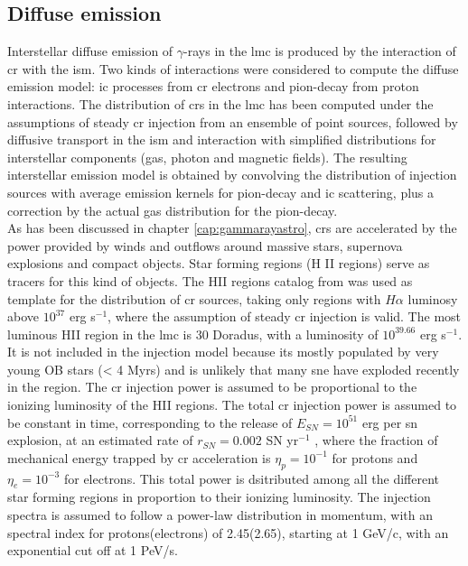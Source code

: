 \documentclass[main.tex]{subfiles}
\begin{document}
\subsection{Diffuse emission}
Interstellar diffuse emission of $\gamma$-rays in the \gls{lmc} is produced by the interaction of \gls{cr} with the \gls{ism}. Two kinds of interactions were considered to compute the diffuse emission model: \gls{ic} processes from \gls{cr} electrons and pion-decay from proton interactions. The distribution of \glspl{cr} in the \gls{lmc} has been computed under the assumptions of steady \gls{cr} injection from an ensemble of point sources, followed by diffusive transport in the \gls{ism} and interaction with simplified distributions for interstellar components (gas, photon and magnetic fields). The resulting interstellar emission model is obtained by convolving the distribution of injection sources with average emission kernels for pion-decay and \gls{ic} scattering, plus a correction by the actual gas distribution for the pion-decay.\\
As has been discussed in chapter \ref{cap:gammarayastro}, \glspl{cr} are accelerated by the power provided by winds and outflows around massive stars, supernova explosions and compact objects. Star forming regions (H II regions) serve as tracers for this kind of objects. The HII regions catalog from \cite{2012HIIinLMC} was used as template for the distribution of \gls{cr} sources, taking only regions with $H\alpha$ luminosy above $10^{37}$ erg s$^{-1}$, where the assumption of steady \gls{cr} injection is valid. The most luminous HII region in the \gls{lmc} is 30 Doradus, with a luminosity of $10^{39.66}$ erg s$^{-1}$. It is not included in the injection model because its mostly populated by very young OB stars (< 4 Myrs) \cite{201130Doradusstarforming} and is unlikely that many \gls{sne} have exploded recently in the region. The \gls{cr} injection power is assumed to be proportional to the ionizing luminosity of the HII regions. The total \gls{cr} injection power is assumed to be constant in time, corresponding to the release of $E_{SN} = 10^{51}$ erg per \gls{sn} explosion, at an estimated rate of $r_{SN} =  0.002$ SN yr$^{-1}$ \cite{1991SNrates}, where the fraction of mechanical energy trapped by \gls{cr} acceleration is $\eta_{p} = 10^{-1}$ for protons and $\eta_{e} = 10^{-3}$ for electrons. This total power is dsitributed among all the different star forming regions in proportion to their ionizing luminosity.
The injection spectra is assumed to follow a power-law distribution in momentum, with an spectral index for protons(electrons) of 2.45(2.65), starting at 1 GeV/c, with an exponential cut off at 1 PeV/s.\\
\end{document}
